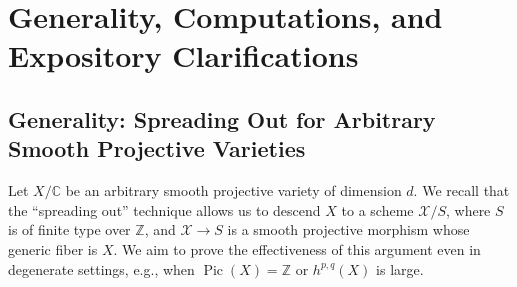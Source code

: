 \documentclass[11pt]{article}
\DeclareMathOperator{\Pic}{Pic}
\begin{document}
\section{Generality, Computations, and Expository Clarifications}\label{sec:generality}

\subsection{Generality: Spreading Out for Arbitrary Smooth Projective Varieties}\label{subsec:spreading-out}
Let \( X/\mathbb{C} \) be an arbitrary smooth projective variety of dimension \( d \). We recall that the “spreading out” technique allows us to descend \( X \) to a scheme \( \mathcal{X}/S \), where \( S \) is of finite type over \( \mathbb{Z} \), and \( \mathcal{X} \to S \) is a smooth projective morphism whose generic fiber is \( X \). We aim to prove the effectiveness of this argument even in degenerate settings, e.g., when \( \Pic(X) = \mathbb{Z} \) or \( h^{p,q}(X) \) is large.
\end{document}
